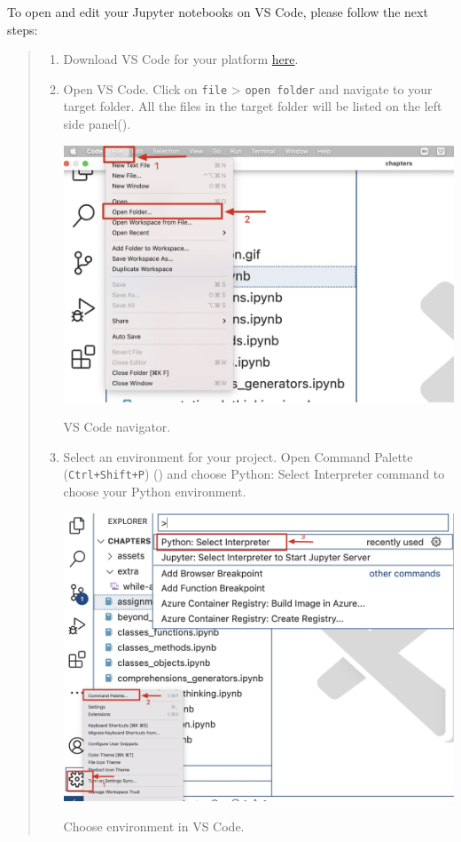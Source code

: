 \documentclass{latex-template/tufte-handout}
\begin{document}
To open and edit your Jupyter notebooks on VS Code, please follow the next steps:
\begin{quote}
\begin{enumerate}
\def\labelenumi{\arabic{enumi}.}
\item Download VS Code for your platform \href{https://code.visualstudio.com/Download}{here}.
\item Open VS Code. Click on \texttt{file} > \texttt{open folder} and navigate to your target folder. All the files in the target folder will be listed on the left side panel().
    \begin{marginfigure}%
      \includegraphics[width=1.0\linewidth]{assets/07-openfile-vscode.jpg}
      \caption{VS Code navigator.}
      \label{fig:vscode-navigator}
    \end{marginfigure}
\item Select an environment for your project. Open Command Palette (\texttt{Ctrl+Shift+P}) () and choose Python: Select Interpreter command to choose your Python environment.
    \begin{marginfigure}%
      \includegraphics[width=1.2\linewidth]{assets/08-choose-env-vscode.jpg}
      \caption{Choose environment in VS Code.}
      \label{fig:environment-vscode}
    \end{marginfigure}



\end{enumerate}
\end{quote}
\end{document}
